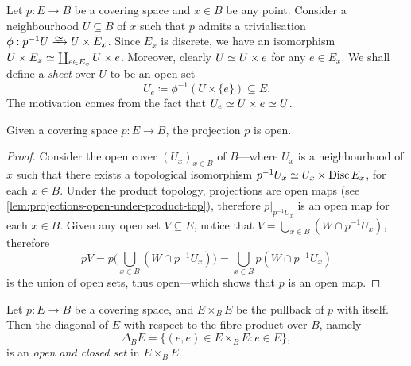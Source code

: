 \begin{notation}[Sheets]
\label{not:coveing-space-sheet}
Let \(p: E \to B\) be a covering space and \(x \in B\) be any point. Consider a
neighbourhood \(U \subseteq B\) of \(x\) such that \(p\) admits a trivialisation
\(\phi: p^{-1} U \isoto U \times E_x\). Since \(E_x\) is discrete, we have an
isomorphism \(U \times E_x \simeq \coprod_{e \in E_x} U \times e\). Moreover,
clearly \(U \simeq U \times e\) for any \(e \in E_x\). We shall define a
\emph{sheet} over \(U\) to be an open set
\begin{equation}\label{eq:covering-space-sheet}
U_e \coloneq \phi^{-1}(U \times \{e\}) \subseteq E.
\end{equation}
The motivation comes from the fact that \(U_e \simeq U \times e \simeq U\).
\end{notation}

\begin{proposition}
\label{prop:covering-projection-is-open}
Given a covering space \(p: E \to B\), the projection \(p\) is open.
\end{proposition}

\begin{proof}
Consider the open cover \((U_x)_{x \in B}\) of \(B\)---where \(U_x\) is a
neighbourhood of \(x\) such that there exists a topological isomorphism
\(p^{-1} U_x \simeq U_x \times \operatorname{Disc} E_x\), for each \(x \in B\). Under the
product topology, projections are open maps (see
\cref{lem:projections-open-under-product-top}), therefore \(p|_{p^{-1} U_x}\) is
an open map for each \(x \in B\). Given any open set \(V \subseteq E\), notice
that \(V = \bigcup_{x \in B} (W \cap p^{-1} U_x)\), therefore
\[
p V = p\Big(\bigcup_{x \in B} (W \cap p^{-1} U_x)\Big)
= \bigcup_{x \in B} p(W \cap p^{-1} U_x)
\]
is the union of open sets, thus open---which shows that \(p\) is an open map.
\end{proof}

\begin{lemma}
\label{lem:fibre-wise-diag-open-and-closed}
Let \(p: E \to B\) be a covering space, and \(E \times_B E\) be the pullback of
\(p\) with itself. Then the diagonal of \(E\) with respect to the fibre product
over \(B\), namely
\[
\Delta_B E = \{(e, e) \in E \times_B E \colon e \in E\},
\]
is an \emph{open and closed set} in \(E \times_B E\).
\end{lemma}

